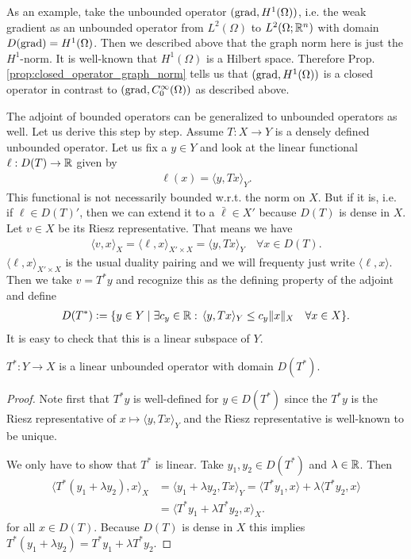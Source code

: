 \documentclass[../master_thesis.tex]{subfiles}
\begin{document}
As an example, take the unbounded operator $(\operatorname{grad}, H^1(\Omega))$,
i.e. the weak gradient as an unbounded operator 
from $L^2(\Omega)$ to $L^2(\Omega;\mathbb{R}^n)$ with 
domain $D(\operatorname{grad}) = H^1(\Omega)$. Then we described above that the 
graph norm here is just the $H^1$-norm. It is well-known that 
$H^1(\Omega)$ is a Hilbert space. Therefore 
Prop.\,\ref{prop:closed_operator_graph_norm} tells us that 
$(\operatorname{grad}, H^1(\Omega))$ is a closed operator in contrast to 
$(\operatorname{grad}, C_0^\infty(\Omega))$ as described above.

The adjoint of bounded operators can be generalized to unbounded operators 
as well. Let us derive this step by step. 
Assume $T: X \rightarrow Y$ is a densely defined unbounded operator. 
Let us fix a $y \in Y$ and 
look at the linear functional $\ell:D(T) \rightarrow \mathbb{R}$ given by
\begin{align*}
    \ell(x) = \langle y, Tx \rangle_Y.
\end{align*}
This functional is not necessarily bounded w.r.t. the norm on $X$. But if it is, i.e. if $\ell \in D(T)'$,
then we can extend it to a
$\bar{\ell} \in X'$ because $D(T)$ is dense in $X$. Let $v \in X$ be its Riesz representative. That means we have
\begin{align*}
    \langle v, x \rangle_X = \langle \ell, x \rangle_{X'\times X} = \langle y, Tx \rangle_Y 
        \quad \forall x \in D(T).
\end{align*}
$\langle \ell, x \rangle_{X'\times X}$ is the usual duality pairing and we will 
frequenty just write $\langle \ell, x \rangle$.
Then we take $v = T^* y$ and 
recognize this as the defining property of the adjoint and define 
\begin{align*}
    D(T^*) \vcentcolon= \{ y \in Y \mid \exists c_y \in \mathbb{R}:
        \,\langle y, Tx \rangle_Y \leq c_y \lVert x \rVert _X \quad\forall x \in X\}.
\end{align*}
It is easy to check that this is a linear subspace of $Y$.

\begin{proposition}
    $T^*: Y \rightarrow X $ is a linear unbounded operator with domain $D(T^*)$.
\end{proposition}
\begin{proof}
    Note first that $T^*y$ is well-defined for $y \in D(T^*)$ since the 
    $T^*y$ is the Riesz representative of $x \mapsto \langle y, Tx \rangle_Y$ 
    and the Riesz representative is well-known to be unique.

    We only have to show that $T^*$ is linear. Take $y_1, y_2 \in D(T^*)$ 
    and $\lambda \in \mathbb{R}$. Then
    \begin{align*}
        \langle T^*(y_1 + \lambda y_2), x \rangle _X
        &= \langle y_1 + \lambda y_2, Tx \rangle _Y
        = \langle T^*y_1, x \rangle + \lambda \langle T^*y_2, x \rangle
        \\ &= \langle T^*y_1 + \lambda T^*y_2, x\rangle_X.
    \end{align*}
    for all $x \in D(T)$. Because $D(T)$ is dense in $X$ this implies 
    $T^*(y_1 + \lambda y_2) = T^*y_1 + \lambda T^*y_2$.
\end{proof}
\end{document}
